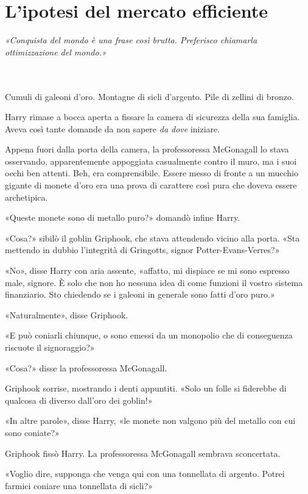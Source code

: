 
\chapter{L’ipotesi del mercato efficiente}
\label{capitolo:4}

\emph{«Conquista del mondo è una frase così brutta. Preferisco chiamarla ottimizzazione del mondo.»}

~\\
~\\

Cumuli di galeoni d’oro. Montagne di sicli d’argento. Pile di zellini di bronzo.

Harry rimase a bocca aperta a fissare la camera di sicurezza della sua famiglia. Aveva così tante domande da non sapere \textit{da dove} iniziare.

Appena fuori dalla porta della camera, la professoressa McGonagall lo stava osservando, apparentemente appoggiata casualmente contro il muro, ma i suoi occhi ben attenti. Beh, era comprensibile. Essere messo di fronte a un mucchio gigante di monete d’oro era una prova di carattere così pura che doveva essere archetipica.

«Queste monete sono di metallo puro?» domandò infine Harry.

«Cosa?» sibilò il goblin Griphook, che stava attendendo vicino alla porta. «Sta mettendo in dubbio l’integrità di Gringotts, signor Potter-Evans-Verres?»

«No», disse Harry con aria assente, «affatto, mi dispiace se mi sono espresso male, signore. È solo che non ho nessuna idea di come funzioni il vostro sistema finanziario. Sto chiedendo se i galeoni in generale sono fatti d’oro puro.»

«Naturalmente», disse Griphook.

«E può coniarli chiunque, o sono emessi da un monopolio che di conseguenza riscuote il signoraggio?»

«Cosa?» disse la professoressa McGonagall.

Griphook sorrise, mostrando i denti appuntiti. «Solo un folle si fiderebbe di qualcosa di diverso dall’oro dei goblin!»

«In altre parole», disse Harry, «le monete non valgono più del metallo con cui sono coniate?»

Griphook fissò Harry. La professoressa McGonagall sembrava sconcertata.

«Voglio dire, supponga che venga qui con una tonnellata di argento. Potrei farmici coniare una tonnellata di sicli?»

